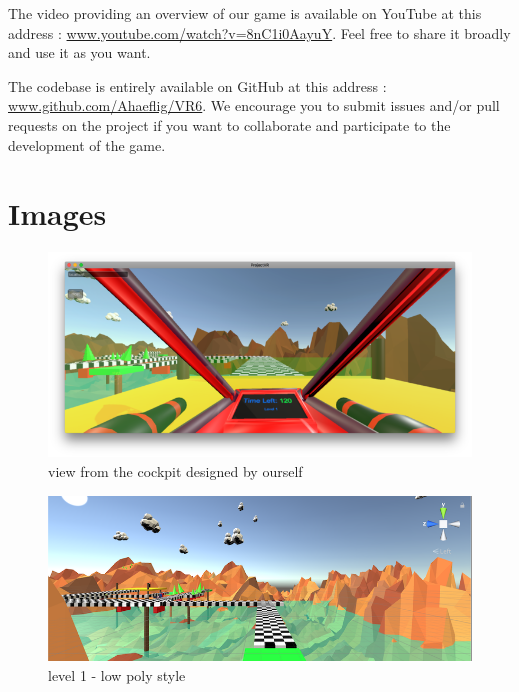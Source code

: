 \documentclass[12pt]{article}
\begin{document}
The video providing an overview of our game is available on YouTube at this address : \href{https://www.youtube.com/watch?v=8nC1i0AayuY}{www.youtube.com/watch?v=8nC1i0AayuY}. Feel free to share it broadly and use it as you want.

The codebase is entirely available on GitHub at this address : \href{https://github.com/Ahaeflig/VR6}{www.github.com/Ahaeflig/VR6}. We encourage you to submit issues and/or pull requests on the project if you want to collaborate and participate to the development of the game.

\newpage

\section{Images}
\begin{figure}[h]
   \caption{\label{étiquette} view from the cockpit designed by ourself}
   \includegraphics[scale=1]{images/cockpit.png}
\end{figure}

\begin{figure}[h]
   \caption{\label{étiquette} level 1 - low poly style}
   \includegraphics[scale=1]{images/level.png}
\end{figure}
\end{document}
